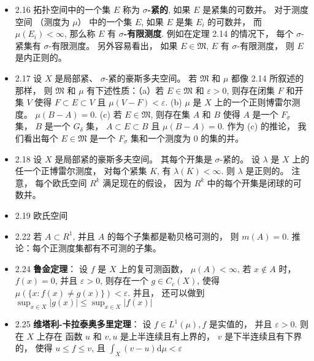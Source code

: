 \begin{itemize}
\item 2.16 拓扑空间中的一个集 $E$ 称为 \textbf{$\sigma$-紧的}, 如果 $E$ 是紧集的可数并。 对于测度空间 （测度为 $\mu$） 中的一个集 $E$, 如果 $E$ 是集 $E_{i}$ 的可数并， 而 $\mu\left(E_{i}\right)<\infty$, 那么称 $E$ 有 \textbf{$\sigma$-有限测度}. 例如在定理 2.14 的情况下， 每个 $\sigma$-紧集有 $\sigma$-有限测度。 另外容易看出， 如果 $E \in\mathfrak{M}$, $E$ 有 $\sigma$-有限测度， 则 $E$ 是内正则的。

\item 2.17 设 $X$ 是局部紧、 $\sigma$-紧的豪斯多夫空间。 若 $\mathfrak{M}$ 和 $\mu$ 都像 2.14 所叙述的那样， 则 $\mathfrak{M}$ 和 $\mu$ 有下述性质：（a）若 $E \in \mathfrak{M}$ 和 $\varepsilon>0$, 则存在闭集 $F$ 和开集 $V$ 使得 $F \subset E \subset V$ 且 $\mu(V-F)<\varepsilon$. (b) $\mu$ 是 $X$ 上的一个正则博雷尔测度。 $\mu(B-A)=0$. (c) 若 $E \in \mathfrak{M}$, 则存在集 $A$ 和 $B$ 使得 $A$ 是一个 $F_{\sigma}$ 集， $B$ 是一个 $G_{\delta}$ 集， $A \subset E \subset B$ 且 $\mu(B-A)=0$. 作为 (c) 的推论， 我们看出每个 $E \in \mathfrak{M}$ 是一个 $F_\sigma$ 集和一个测度为 0 的集的并。

\item 2.18 设 $X$ 是局部紧的豪斯多夫空间。 其每个开集是 $\sigma$-紧的。 设 $\lambda$ 是 $X$ 上的任一个正博雷尔测度， 对每个紧集 $K$, 有 $\lambda(K)<\infty$. 则 $\lambda$ 是正则的。 注意， 每个欧氏空间 $R^{k}$ 满足现在的假设， 因为 $R^{k}$ 中的每个开集是闭球的可数并。

\item 2.19 欧氏空间

\item 2.22 若 $A \subset R^{1}$, 并且 $A$ 的每个子集都是勒贝格可测的， 则 $m(A)=0$. 推论：每个正测度集都有不可测的子集。

\item 2.24 \textbf{鲁金定理}： 设 $f$ 是 $X$ 上的复可测函数， $\mu(A)<\infty$, 若 $x \notin A$ 时， $f(x)=0$, 并且 $\varepsilon>0$, 则存在一个 $g \in C_{c}(X)$, 使得 $\mu(\{x: f(x) \neq g(x)\})<\varepsilon$. 并且， 还可以做到 $\sup _{x \in X}|g(x)| \leqslant \sup _{x \in X}|f(x)|$

\item 2.25 \textbf{维塔利-卡拉泰奥多里定理}： 设 $f \in L^{1}(\mu), f$ 是实值的， 并且 $\varepsilon>0$. 则在 $X$ 上存在 函数 $u$ 和 $v, u$ 是上半连续且有上界的， $v$ 是下半连续且有下界的， 使得 $u \leqslant f \leqslant v$, 且 $\int_{X}(v-u) \mathrm{d} \mu<\varepsilon$

\end{itemize}


